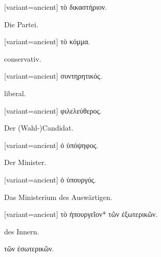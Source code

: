 \switchcolumn

\begin{greek}[variant=ancient]%
τὸ δικαστήριον.

\end{greek}%
\switchcolumn*

Die Partei.

\switchcolumn

\begin{greek}[variant=ancient]%
τὸ κόμμα.

\end{greek}%
\switchcolumn*

conservativ.

\switchcolumn

\begin{greek}[variant=ancient]%
συντηρητικός.

\end{greek}%
\switchcolumn*

liberal.

\switchcolumn

\begin{greek}[variant=ancient]%
φιλελεύθερος.

\end{greek}%
\switchcolumn*

Der (Wahl-)Candidat.

\switchcolumn

\begin{greek}[variant=ancient]%
ὁ ὑπόψηφος.

\end{greek}%
\switchcolumn*

Der Minister.

\switchcolumn

\begin{greek}[variant=ancient]%
ὁ ὑπουργός.

\end{greek}%
\switchcolumn*

Das Ministerium des Aus\textcompwordmark{}wärtigen. 

\switchcolumn

\begin{greek}[variant=ancient]%
τὸ ἡπουργεῖον{*} τῶν ἐξωτερικῶν.

\end{greek}%
\switchcolumn*

\qquad{}des Innern.

\switchcolumn

\qquad{}\textgreek[variant=ancient]{τῶν ἐσωτερικῶν.}


